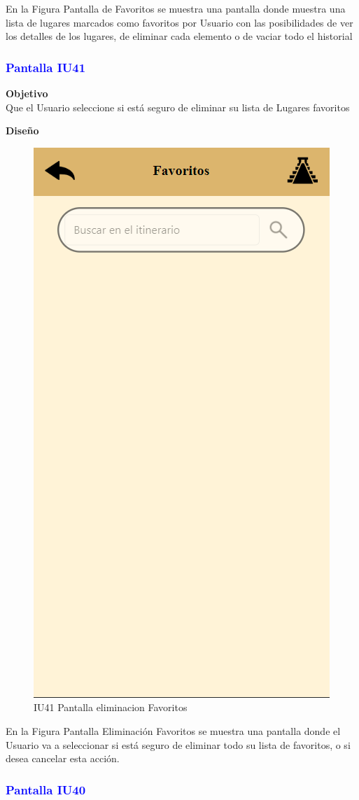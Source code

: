 En la Figura Pantalla de Favoritos se muestra una pantalla donde muestra una lista de lugares marcados como favoritos por Usuario con las posibilidades de ver los detalles de los lugares, de eliminar cada elemento o de vaciar todo el historial

\subsubsection{\textcolor{blue}{Pantalla IU41}}

\textbf{Objetivo} \\
Que el Usuario seleccione si está seguro de eliminar su lista de Lugares favoritos
\vspace{15pt}

\textbf{Diseño}

    \begin{figure}[h]
        
            \centering
            \includegraphics[width=.4\linewidth]{entregable final/pantallasSistema/IU18 Pantalla Favoritos.png}
        \caption{IU41 Pantalla eliminacion Favoritos}
    
    \end{figure}

En la Figura Pantalla Eliminación Favoritos se muestra una pantalla donde el Usuario va a seleccionar si está seguro de eliminar todo su lista de favoritos, o si desea cancelar esta acción. 


\newpage
\subsubsection{\textcolor{blue}{Pantalla IU40 }}


